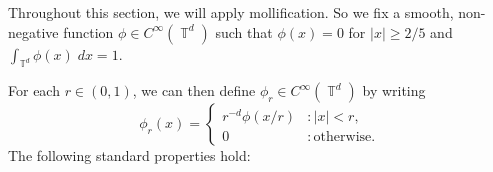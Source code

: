 \documentclass[dvipsnames,letterpaper,12pt]{article}
\numberwithin{equation}{section}
\DeclareMathOperator{\TT}{\mathbb{T}}
\newtheorem{theorem}{Theorem}
\numberwithin{theorem}{section}
\begin{document}
Throughout this section, we will apply mollification. So we fix a smooth, non-negative function $\phi \in C^\infty(\TT^d)$ such that $\phi(x) = 0$ for $|x| \geq 2/5$ and $\int_{\TT^d} \phi(x)\; dx = 1$.
%
\begin{comment}
\begin{theorem} \label{equationASFGCISIX}
    There exists a smooth probability density $\phi \in C^\infty(\TT^d)$ such that $\phi(x) = 0$ for $|x| \geq 2/5$, and such that for each $x \in \TT^d$
    \[ \sum_{k \in \{ 0, 1 \}^d} \phi(x + k/2) = 2^d. \]
\end{theorem}
\begin{proof}
    Let $\psi$ be a non-negative smooth function on $\TT$ such that $\psi(x) = \psi(- x)$ for all $x \in \TT$, $\psi(x) = 1$ for $|x| \leq 1/10$, $\psi(x) = 0$ for $|x| \geq 2/10$, and $0 \leq \psi(x) \leq 1$ for all $x \in \TT$. Then define $\eta$ to be the non-negative, $C^\infty$ function
    \[ \eta(x) = \frac{1}{2} - \frac{\psi(x) + \psi(x + 1/2)}{2}. \]
    If we define
    \[ \phi_0(x) = 2(\psi(x) + \eta(x)), \]
    then $\phi_0(x) + \phi_0(x + 1/2) = 2$ for all $x \in \TT$. Moreover, if $|x| \geq 2/5$, then $\psi(x) = 0$, and since this implies $|x + 1/2| \leq 1/10$, we find $\eta(x) = 0$. Thus $\phi_0(x) = 0$ for $|x| \geq 2/5$. But the condition $\phi_0(x) + \phi_0(x + 1/2) = 2$ implies that $\phi_0$ is a probability density function. Thus it suffices to define
    \[ \phi(x_1, \dots, x_d) = \phi_0(x_1) \dots \phi_0(x_d). \qedhere \]
\end{proof}
\end{comment}
%
For each $r \in (0,1)$, we can then define $\phi_r \in C^\infty(\TT^d)$ by writing
%
\[ \phi_r(x) = \begin{cases} r^{-d} \phi(x/r) &: |x| < r, \\ 0 &: \text{otherwise}. \end{cases} \]
%
The following standard properties hold:
%
\end{document}
